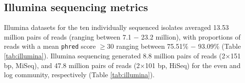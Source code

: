 \documentclass[a4paper,num-refs]{oup-contemporary}
\begin{document}
\subsection{Illumina sequencing metrics}
Illumina datasets for the ten individually sequenced isolates averaged 13.53 million pairs of reads (ranging between 7.1 $-$ 23.2 million), with proportions of reads with a mean \texttt{phred} score $\geq$30 ranging between 75.51\% $-$ 93.09\% (Table \ref{tab:illumina}).
Illumina sequencing generated 8.8 million pairs of reads (2$\times$151 bp, MiSeq), and 47.8 million pairs of reads (2$\times$101 bp, HiSeq) for the even and log community, respectively (Table \ref{tab:illumina}).
\end{document}
